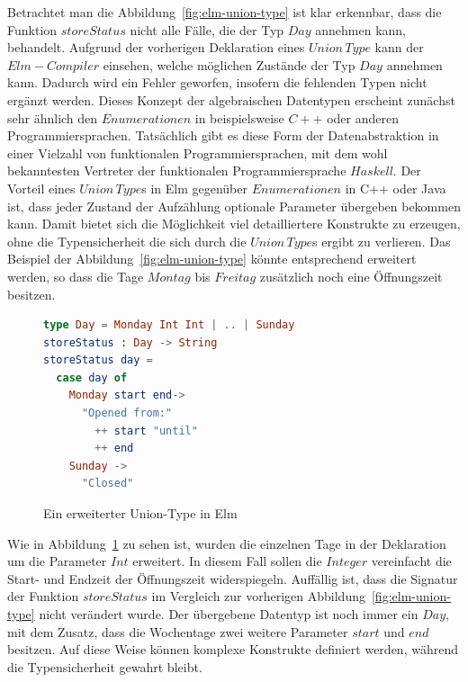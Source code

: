 Betrachtet man die Abbildung~\ref{fig:elm-union-type} ist klar erkennbar, dass die Funktion $storeStatus$ nicht alle Fälle, die der Typ $Day$ annehmen kann, behandelt. Aufgrund der vorherigen Deklaration eines $Union\,Type$ kann der $Elm-Compiler$ einsehen, welche möglichen Zustände der Typ $Day$ annehmen kann. Dadurch wird ein Fehler geworfen, insofern die fehlenden Typen nicht ergänzt werden. Dieses Konzept der algebraischen Datentypen erscheint zunächst sehr ähnlich den $Enumerationen$ in beispielsweise $C++$ oder anderen Programmiersprachen. Tatsächlich gibt es diese Form der Datenabstraktion in einer Vielzahl von funktionalen Programmiersprachen, mit dem wohl bekanntesten Vertreter der funktionalen Programmiersprache $Haskell$. Der Vorteil eines $Union\,Type$s in Elm gegenüber $Enumerationen$ in C++ oder Java ist, dass jeder Zustand der Aufzählung optionale Parameter übergeben bekommen kann. Damit bietet sich die Möglichkeit viel detailliertere Konstrukte zu erzeugen, ohne die Typensicherheit die sich durch die $Union\,Type$s ergibt zu verlieren. Das Beispiel der Abbildung~\ref{fig:elm-union-type} könnte entsprechend erweitert werden, so dass die Tage $Montag$ bis $Freitag$ zusätzlich noch eine Öffnungszeit besitzen.
\begin{figure}[h]
\begin{lstlisting}[language=Elm]
type Day = Monday Int Int | .. | Sunday
storeStatus : Day -> String
storeStatus day =
  case day of
    Monday start end->
      "Opened from:"
      	++ start "until"
      	++ end
    Sunday ->
      "Closed"
\end{lstlisting}
\caption{Ein erweiterter Union-Type in Elm}\label{fig:elm-union-type-advanced}
\end{figure}
Wie in Abbildung~\ref{fig:elm-union-type-advanced} zu sehen ist, wurden die einzelnen Tage in der Deklaration um die Parameter $Int$ erweitert. In diesem Fall sollen die $Integer$ vereinfacht die Start- und Endzeit der Öffnungszeit widerspiegeln. Auffällig ist, dass die Signatur der Funktion $storeStatus$ im Vergleich zur vorherigen Abbildung~\ref{fig:elm-union-type} nicht verändert wurde. Der übergebene Datentyp ist noch immer ein $Day$, mit dem Zusatz, dass die Wochentage zwei weitere Parameter $start$ und $end$ besitzen. Auf diese Weise können komplexe Konstrukte definiert werden, während die Typensicherheit gewahrt bleibt.

